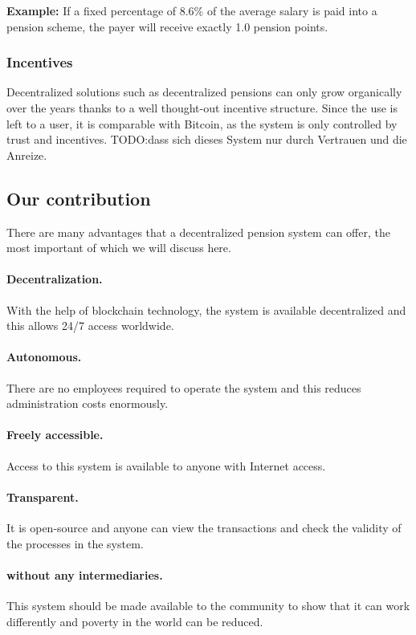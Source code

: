 \textbf{Example:} If a fixed percentage of 8.6\% of the average salary is paid into a pension scheme, the payer will receive exactly 1.0 pension points.


\subsubsection{Incentives}


Decentralized solutions such as decentralized pensions can only grow organically over the years thanks to a well thought-out incentive structure. Since the use is left to a user, it is comparable with Bitcoin\cite{nakamoto2012bitcoin}, as the system is only controlled by trust and incentives.
TODO:dass sich dieses System nur durch Vertrauen und die Anreize.


\subsection{Our contribution}
There are many advantages that a decentralized pension system can offer, the most important of which we will discuss here.

\paragraph{Decentralization.} With the help of blockchain technology, the system is available decentralized and this allows 24/7 access worldwide.

\paragraph{Autonomous.} There are no employees required to operate the system and this reduces administration costs enormously.

\paragraph{Freely accessible.} Access to this system is available to anyone with Internet access.

\paragraph{Transparent.} It is open-source and anyone can view the transactions and check the validity of the processes in the system.

\paragraph{without any intermediaries.} This system should be made available to the community to show that it can work differently and poverty in the world can be reduced.

